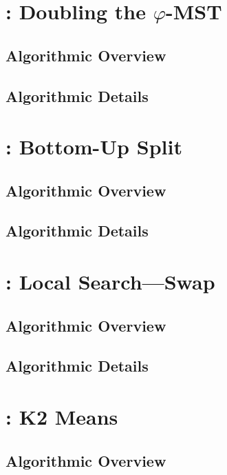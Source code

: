 \documentclass[11.5pt]{report}
\begin{document}
\section{: Doubling the $\varphi$-MST}  

\subsection{Algorithmic Overview}
\subsection{Algorithmic Details}
\section{: Bottom-Up Split}  

\subsection{Algorithmic Overview}
\subsection{Algorithmic Details}\section{: Local Search---Swap}  
\subsection{Algorithmic Overview}
\subsection{Algorithmic Details}
\section{: K2 Means}  

\subsection{Algorithmic Overview}
\end{document}
